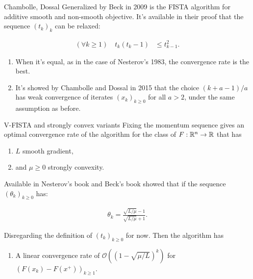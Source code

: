 \documentclass[11pt]{beamer}
\theoremstyle{definition}
\begin{document}
        \begin{frame}{Chambolle, Dossal}
            Generalized by Beck \cite{beck_fast_2009-1} in 2009 is the FISTA algorithm for additive smooth and non-smooth objective. 
            It's available in their proof that the sequence $(t_k)_{k}$ can be relaxed: 
            \begin{tcolorbox}\noindent\vspace{-1em}
                \begin{align*}
                    (\forall k \ge 1)\quad t_k (t_k - 1) &\le t_{k - 1}^2. 
                \end{align*}    
            \end{tcolorbox}
            \begin{enumerate}
                \item When it's equal, as in the case of Nesterov's 1983, the convergence rate is the best. 
                \item It's showed by Chambolle and Dossal in 2015 \cite{chambolle_convergence_2015} that the choice $(k + a -1)/a$ has weak convergence of iterates $(x_k)_{k \ge 0}$ for all $a > 2$, under the same assumption as before. 
            \end{enumerate}
        \end{frame}
        \begin{frame}{V-FISTA and strongly convex variants}
            Fixing the momentum sequence gives an optimal convergence rate of the algorithm for the class of $F:\mathbb R^n \rightarrow \mathbb R$ that has 
            \begin{enumerate}
                \item $L$ smooth gradient, 
                \item and $\mu \ge 0$ strongly convexity. 
            \end{enumerate}
            Available in Nesterov's book \cite{nesterov_lectures_2018} and Beck's book \cite{beck_first-order_2017} showed that if the sequence $(\theta_k)_{k\ge 0}$ has: 
            \begin{tcolorbox}
                \begin{align*}
                   \theta_k = \frac{\sqrt{L/\mu} - 1}{\sqrt{L/\mu} + 1}. 
                \end{align*}
            \end{tcolorbox}
            Disregarding the definition of $(t_k)_{k \ge 0}$ for now. 
            Then the algorithm has
            \begin{enumerate}
                \item A linear convergence rate of $\mathcal O((1 - \sqrt{\mu/L})^k)$ for $(F(x_k) - F(x^+))_{k \ge 1}$. 
            \end{enumerate}
        \end{frame}
\end{document}
